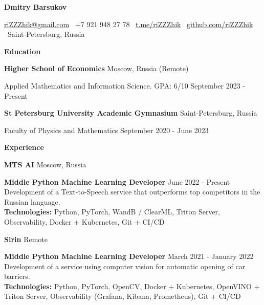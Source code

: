 \documentclass[11pt]{article}
\begin{document}
\begin{center}
    \textbf{Dmitry Barsukov}\\
    \hrulefill
\end{center}

\begin{center}
    \href{mailto:riZZZhik@gmail.com}{riZZZhik@gmail.com} \textbullet \ +7 921 948 27 78 \textbullet \ \href{https://t.me/riZZZhik}{t.me/riZZZhik} \textbullet \ \href{https://github.com/riZZZhik}{github.com/riZZZhik} \textbullet \ Saint-Petersburg, Russia
\end{center}

\vspace{0.5pt}

\begin{center}
    \textbf{Education}
\end{center}
\textbf{Higher School of Economics} \hfill Moscow, Russia (Remote)

Applied Mathematics and Information Science. GPA: 6/10 \hfill September 2023 - Present


\vspace{12pt}

\textbf{St Petersburg University Academic Gymnasium} \hfill	Saint-Petersburg, Russia

Faculty of Physics and Mathematics \hfill September 2020 - June 2023

\vspace{12pt}

\begin{center}
    \textbf{Experience}
\end{center}



\textbf{MTS AI} \hfill Moscow, Russia

\textbf{Middle Python Machine Learning Developer} \hfill June 2022 - Present \\[2ex]
Development of a Text-to-Speech service that outperforms top competitors in the Russian language. \\
\textbf{Technologies:} Python, PyTorch, WandB / ClearML, Triton Server, Observability, Docker + Kubernetes, Git + CI/CD

\vspace{12pt}

\textbf{Sirin} \hfill Remote

\textbf{Middle Python Machine Learning Developer} \hfill March 2021 - January 2022 \\[2ex]
Development of a service using computer vision for automatic opening of car barriers. \\
\textbf{Technologies:} Python, PyTorch, OpenCV, Docker + Kubernetes, OpenVINO + Triton Server, Observability (Grafana, Kibana, Prometheus), Git + CI/CD
\end{document}
